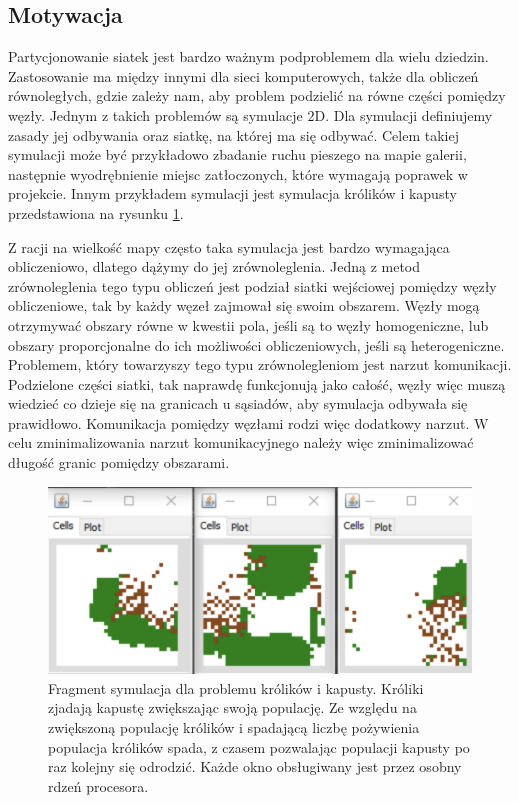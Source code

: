 \subsection{Motywacja}
Partycjonowanie siatek jest bardzo ważnym podproblemem dla wielu dziedzin.
Zastosowanie ma między innymi dla sieci komputerowych, także dla obliczeń równoległych, gdzie zależy nam,
aby problem podzielić na równe części pomiędzy węzły.
Jednym z takich problemów są symulacje $2$D.
Dla symulacji definiujemy zasady jej odbywania oraz siatkę, na której ma się odbywać.
Celem takiej symulacji może być przykładowo zbadanie ruchu pieszego na mapie galerii, następnie wyodrębnienie miejsc
zatłoczonych, które wymagają poprawek w projekcie.
Innym przykładem symulacji jest symulacja królików i kapusty przedstawiona na rysunku \ref{im:kroliki}.

Z racji na wielkość mapy często taka symulacja jest bardzo wymagająca obliczeniowo, dlatego dążymy do jej
zrównoleglenia.
Jedną z metod zrównoleglenia tego typu obliczeń jest podział siatki wejściowej pomiędzy węzły obliczeniowe,
tak by każdy węzeł zajmował się swoim obszarem.
Węzły mogą otrzymywać obszary równe w kwestii pola, jeśli są to węzły homogeniczne, lub obszary proporcjonalne do ich
możliwości obliczeniowych, jeśli są heterogeniczne.
Problemem, który towarzyszy tego typu zrównolegleniom jest narzut komunikacji.
Podzielone części siatki, tak naprawdę funkcjonują jako całość, węzły więc muszą wiedzieć co dzieje się na granicach u sąsiadów,
aby symulacja odbywała się prawidłowo.
Komunikacja pomiędzy węzłami rodzi więc dodatkowy narzut.
W celu zminimalizowania narzut komunikacyjnego należy więc zminimalizować długość granic pomiędzy obszarami.

\begin{figure}[h]
    \centering
    \includegraphics[width=0.6\linewidth]{images/kroliki}
    \caption{Fragment symulacja dla problemu królików i kapusty. Króliki zjadają kapustę zwiększając swoją populację. Ze względu
    na zwiększoną populację królików i spadającą liczbę pożywienia populacja królików spada, z czasem pozwalając
    populacji kapusty po raz kolejny się odrodzić. Każde okno obsługiwany jest przez osobny rdzeń procesora.}
    \label{im:kroliki}
\end{figure}

